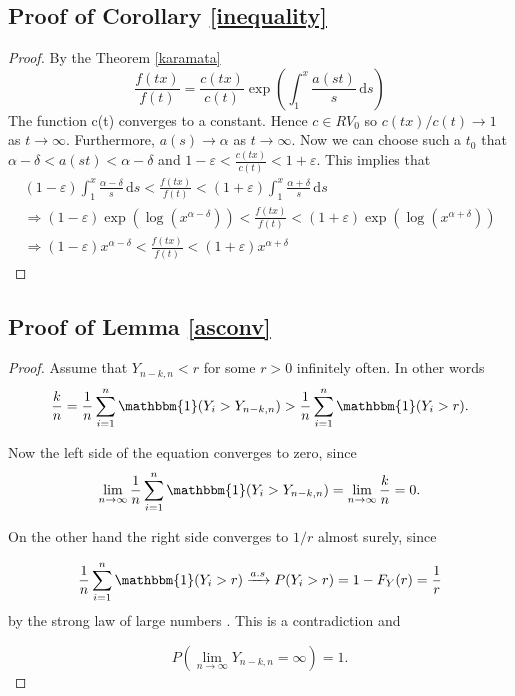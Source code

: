 \documentclass[english,12pt,a4paper,pdftex,sci,utf8]{aaltothesis} %
\begin{document}
\subsection{Proof of Corollary \ref{inequality}}

\begin{proof}
By the Theorem \ref{karamata}
\begin{equation*}
\frac{f(tx)}{f(t)}=\frac{c(tx)}{c(t)}\exp \left(\int_1^x \frac{a(st)}{s}\,\mathrm{d}s \right)
\end{equation*}
The function c(t) converges to a constant. Hence $c \in RV_0$ so $c(tx)/c(t)\rightarrow 1$ as $t \rightarrow \infty$. Furthermore, $a(s) \rightarrow \alpha$ as $t \rightarrow \infty$. Now we can choose such a $t_0$ that $\alpha-\delta<a(st)<\alpha-\delta$ and $1-\varepsilon<\frac{c(tx)}{c(t)}<1+\varepsilon$. This implies that
\begin{equation*}
\begin{split}
(1-\varepsilon)\int_1^x \frac{\alpha-\delta}{s}\,\mathrm{d}s<\frac{f(tx)}{f(t)}<(1+\varepsilon)\int_1^x \frac{\alpha+\delta}{s}\,\mathrm{d}s \\
\Rightarrow (1-\varepsilon)\exp \left( \log \left( x^{\alpha-\delta} \right) \right)<\frac{f(tx)}{f(t)}<(1+\varepsilon)\exp \left( \log \left( x^{\alpha+\delta} \right) \right) \\
\Rightarrow (1-\varepsilon)x^{\alpha-\delta}<\frac{f(tx)}{f(t)}<(1+\varepsilon)x^{\alpha+\delta}
\end{split}
\end{equation*}
\end{proof}


\subsection{Proof of Lemma \ref{asconv}}

\begin{proof}
Assume that $Y_{n-k,n} < r$ for some $r > 0$ infinitely often. In other words
\begin{equation*}
\frac{k}{n} = \frac{1}{n} \sum_{i=1}^{n} \mathbbm{1}(Y_i>Y_{n-k,n}) > \frac{1}{n} \sum_{i=1}^{n} \mathbbm{1}(Y_i>r).
\end{equation*}

Now the left side of the equation converges to zero, since
\begin{equation*}
\lim_{n\to\infty} \frac{1}{n} \sum_{i=1}^{n} \mathbbm{1}(Y_i>Y_{n-k,n}) = \lim_{n\to\infty} \frac{k}{n} =0.
\end{equation*}

On the other hand the right side converges to $1/r$ almost surely, since

\begin{equation*}
\frac{1}{n} \sum_{i=1}^{n} \mathbbm{1}(Y_i>r) \xrightarrow{a.s} P(Y_i>r) = 1-F_Y(r) = \frac{1}{r}
\end{equation*}
by the strong law of large numbers \cite{rosenthal}. This is a contradiction and 

\begin{equation*}
P(\lim_{n\to\infty} Y_{n-k,n} = \infty)=1.
\end{equation*}
\end{proof}
\end{document}
